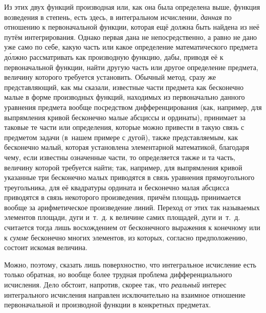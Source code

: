 Из этих двух функций производная или, как она была определена выше, функция
возведения в степень, есть здесь, в интегральном исчислении, {\em данная} по
отношению к первоначальной функции, которая ещё должна быть найдена из неё
путём интегрирования. Однако первая дана не непосредственно, а равно не дано
уже само по себе, какую часть или какое определение математического предмета
д\'{о}лжно рассматривать как производную функцию, дабы, приводя её
к первоначальной функции, найти другую часть или другое определение
предмета, величину которого требуется установить. Обычный
метод, сразу же представляющий, как мы сказали, известные части предмета как
бесконечно малые в форме производных функций, находимых из первоначально
данного уравнения предмета вообще посредством дифференцирования (как, например,
для выпрямления кривой бесконечно малые абсциссы и ординаты), принимает за
таковые те части или определения, которые можно привести в такую связь с
предметом задачи (в~нашем примере с дугой), также представляемым, как
бесконечно малый, которая установлена элементарной математикой, благодаря чему,
если известны означенные части, то определяется также и та часть, величину
которой требуется найти; так, например, для выпрямления кривой указанные три
бесконечно малых приводятся в связь уравнения прямоугольного треугольника, для
её квадратуры ордината и бесконечно малая абсцисса приводятся в связь
некоторого произведения, причём площадь принимается вообще за арифметическое
произведение линий. Переход от этих так называемых элементов площади, дуги
и~т.~д. к величине самих площадей, дуги и~т.~д. считается тогда лишь
восхождением от бесконечного выражения к конечному или к {\em сумме} бесконечно
многих элементов, из которых, согласно предположению, состоит искомая величина.

Можно, поэтому, сказать лишь поверхностно, что интегральное исчисление есть
только обратная, но вообще более трудная проблема дифференциального исчисления.
Дело обстоит, напротив, скорее так, что {\em реальный} интерес интегрального
исчисления направлен исключительно на взаимное отношение первоначальной и
производной функции в конкретных предметах.

